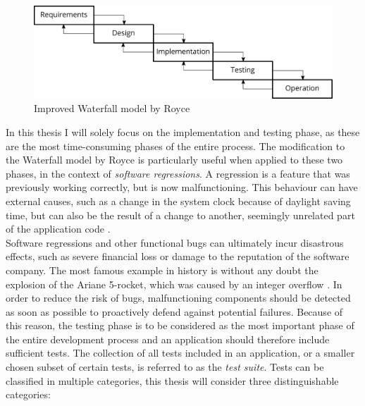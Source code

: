 \begin{figure}[htbp!]
	\centering
	\includegraphics[width=\textwidth]{assets/sdlc.pdf}
	\caption{Improved Waterfall model by Royce}
	\label{fig:waterfall-royce}
\end{figure}

\noindent In this thesis I will solely focus on the implementation and testing phase, as these are the most time-consuming phases of the entire process. The modification to the Waterfall model by Royce is particularly useful when applied to these two phases, in the context of \emph{software regressions}. A regression \cite{10.1007/978-3-540-77966-7_18} is a feature that was previously working correctly, but is now malfunctioning. This behaviour can have external causes, such as a change in the system clock because of daylight saving time, but can also be the result of a change to another, seemingly unrelated part of the application code \cite{6588537}.\\

\noindent Software regressions and other functional bugs can ultimately incur disastrous effects, such as severe financial loss or damage to the reputation of the software company. The most famous example in history is without any doubt the explosion of the Ariane 5-rocket, which was caused by an integer overflow \cite{581900}. In order to reduce the risk of bugs, malfunctioning components should be detected as soon as possible to proactively defend against potential failures. Because of this reason, the testing phase is to be considered as the most important phase of the entire development process and an application should therefore include sufficient tests. The collection of all tests included in an application, or a smaller chosen subset of certain tests, is referred to as the \emph{test suite}. Tests can be classified in multiple categories, this thesis will consider three distinguishable categories:

